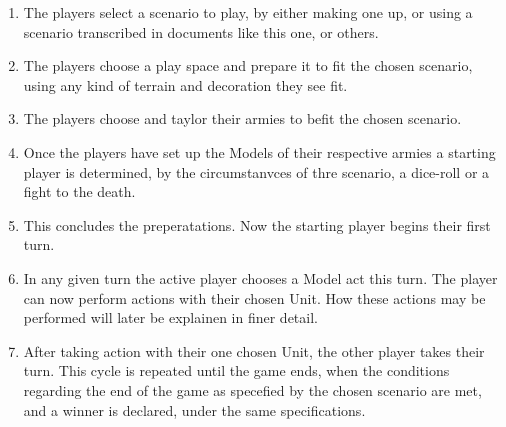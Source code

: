 \documentclass[a4paper,12pt]{book}
\begin{document}
\begin{adjustwidth}{-2cm}{-2cm}
\begin{multicols}{2}
\begin{enumerate}

	\item The players select a scenario to play, by either making one up, or using a scenario transcribed in documents like this one, or others.
	\item The players choose a play space and prepare it to fit the chosen scenario, using any kind of terrain and decoration they see fit.
	\item The players choose and taylor their armies to befit the chosen scenario.
 	\item Once the players have set up the Models of their respective armies a starting player is determined, by the circumstanvces of thre scenario, a dice-roll or a fight to the death.
	\item This concludes the preperatations. Now the starting player begins their first turn.
	\item In any given turn the active player chooses a Model act this turn. The player can now perform actions with their chosen Unit. How these actions may be performed will later be explainen in finer detail.
	\item After taking action with their one chosen Unit, the other player takes their turn. This cycle is repeated until the game ends, when the conditions regarding the end of the game as specefied by the chosen scenario are met, and a winner is declared, under the same specifications.
	
\end{enumerate}
\end{multicols}
\end{adjustwidth}
\end{document}
